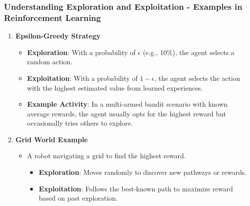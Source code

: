 \documentclass[aspectratio=169]{beamer}
\begin{document}
\begin{frame}[fragile]
    \frametitle{Understanding Exploration and Exploitation - Examples in Reinforcement Learning}
    \begin{enumerate}
        \item \textbf{Epsilon-Greedy Strategy}
            \begin{itemize}
                \item \textbf{Exploration}: With a probability of $\epsilon$ (e.g., 10\%), the agent selects a random action.
                \item \textbf{Exploitation}: With a probability of $1 - \epsilon$, the agent selects the action with the highest estimated value from learned experiences.
                \item \textbf{Example Activity}: In a multi-armed bandit scenario with known average rewards, the agent usually opts for the highest reward but occasionally tries others to explore.
            \end{itemize}
        
        \item \textbf{Grid World Example}
            \begin{itemize}
                \item A robot navigating a grid to find the highest reward.
                \begin{itemize}
                    \item \textbf{Exploration}: Moves randomly to discover new pathways or rewards.
                    \item \textbf{Exploitation}: Follows the best-known path to maximize reward based on past exploration.
                \end{itemize}
            \end{itemize}
    \end{enumerate}
\end{frame}
\end{document}
